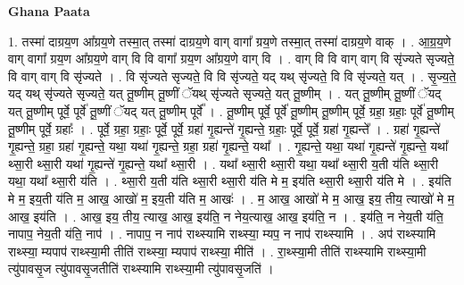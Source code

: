 \documentclass[17pt]{extarticle}
\begin{document}
\textbf{Ghana Paata } \newline

1. तस्मा॑ दाग्रय॒ण आ᳚ग्रय॒णे तस्मा॒त् तस्मा॑ दाग्रय॒णे वाग् वागा᳚ ग्रय॒णे तस्मा॒त् तस्मा॑ दाग्रय॒णे वाक् । . आ॒ग्र॒य॒णे वाग् वागा᳚ ग्रय॒ण आ᳚ग्रय॒णे वाग् वि वि वागा᳚ ग्रय॒ण आ᳚ग्रय॒णे वाग् वि । . वाग् वि वि वाग् वाग् वि सृ॑ज्यते सृज्यते॒ वि वाग् वाग् वि सृ॑ज्यते । . वि सृ॑ज्यते सृज्यते॒ वि वि सृ॑ज्यते॒ यद् यथ् सृ॑ज्यते॒ वि वि सृ॑ज्यते॒ यत् । . सृ॒ज्य॒ते॒ यद् यथ् सृ॑ज्यते सृज्यते॒ यत् तू॒ष्णीम् तू॒ष्णीं ॅयथ् सृ॑ज्यते सृज्यते॒ यत् तू॒ष्णीम् । . यत् तू॒ष्णीम् तू॒ष्णीं ॅयद् यत् तू॒ष्णीम् पूर्वे॒ पूर्वे॑ तू॒ष्णीं ॅयद् यत् तू॒ष्णीम् पूर्वे᳚ । . तू॒ष्णीम् पूर्वे॒ पूर्वे॑ तू॒ष्णीम् तू॒ष्णीम् पूर्वे॒ ग्रहा॒ ग्रहाः॒ पूर्वे॑ तू॒ष्णीम् तू॒ष्णीम् पूर्वे॒ ग्रहाः᳚ । . पूर्वे॒ ग्रहा॒ ग्रहाः॒ पूर्वे॒ पूर्वे॒ ग्रहा॑ गृ॒ह्यन्ते॑ गृ॒ह्यन्ते॒ ग्रहाः॒ पूर्वे॒ पूर्वे॒ ग्रहा॑ गृ॒ह्यन्ते᳚ । . ग्रहा॑ गृ॒ह्यन्ते॑ गृ॒ह्यन्ते॒ ग्रहा॒ ग्रहा॑ गृ॒ह्यन्ते॒ यथा॒ यथा॑ गृ॒ह्यन्ते॒ ग्रहा॒ ग्रहा॑ गृ॒ह्यन्ते॒ यथा᳚ । . गृ॒ह्यन्ते॒ यथा॒ यथा॑ गृ॒ह्यन्ते॑ गृ॒ह्यन्ते॒ यथा᳚ थ्सा॒री थ्सा॒री यथा॑ गृ॒ह्यन्ते॑ गृ॒ह्यन्ते॒ यथा᳚ थ्सा॒री । . यथा᳚ थ्सा॒री थ्सा॒री यथा॒ यथा᳚ थ्सा॒री य॒ती य॑ति थ्सा॒री यथा॒ यथा᳚ थ्सा॒री य॑ति । . थ्सा॒री य॒ती य॑ति थ्सा॒री थ्सा॒री य॑ति मे म॒ इय॑ति थ्सा॒री थ्सा॒री य॑ति मे । . इय॑ति मे म॒ इय॒ती य॑ति म॒ आख॒ आखो॑ म॒ इय॒ती य॑ति म॒ आखः॑ । . म॒ आख॒ आखो॑ मे म॒ आख॒ इय॒ तीय॒ त्याखो॑ मे म॒ आख॒ इय॑ति । . आख॒ इय॒ तीय॒ त्याख॒ आख॒ इय॑ति॒ न नेय॒त्याख॒ आख॒ इय॑ति॒ न । . इय॑ति॒ न नेय॒ती य॑ति॒ नापाप॒ नेय॒ती य॑ति॒ नाप॑ । . नापाप॒ न नाप॑ राथ्स्यामि राथ्स्या॒ म्यप॒ न नाप॑ राथ्स्यामि । . अप॑ राथ्स्यामि राथ्स्या॒ म्यपाप॑ राथ्स्या॒मी तीति॑ राथ्स्या॒ म्यपाप॑ राथ्स्या॒ मीति॑ । . रा॒थ्स्या॒मी तीति॑ राथ्स्यामि राथ्स्या॒मी त्यु॑पावसृ॒ज त्यु॑पावसृ॒जतीति॑ राथ्स्यामि राथ्स्या॒मी त्यु॑पावसृ॒जति॑ । \newline
\end{document}
